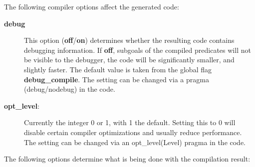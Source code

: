 The following compiler options affect the generated code:
\begin{description}
\item[{\bf debug}]
    This option ({\bf off}/{\bf on}) determines whether the resulting code contains
    debugging information.  If {\bf off}, subgoals of the compiled predicates will
    not be visible to the debugger, the code will be significantly smaller,
    and slightly faster.
    The default value is taken from the global flag {\bf debug_compile}.
    The setting can be changed via a pragma (debug/nodebug) in the code.

\item[{\bf opt_level}:]
    Currently the integer 0 or 1, with 1 the default. Setting this to 0
    will disable certain compiler optimizations and usually reduce performance.
    The setting can be changed via an opt_level(Level) pragma in the code.
\end{description}
The following options determine what is being done with the compilation result:
